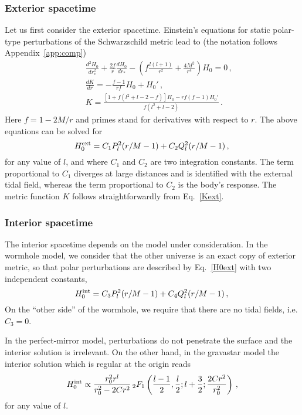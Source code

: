 \documentclass[aps,twocolumn,showpacs,preprintnumbers,nofootinbib,prd,superscriptaddress,groupedaddress,10pt]{revtex4-1}
\def\be{\begin{equation}}
\def\ee{\end{equation}}
\newcommand{\beq}{\begin{eqnarray}}
\newcommand{\eeq}{\end{eqnarray}}
\begin{document}
\subsubsection{Exterior spacetime}
Let us first consider the exterior spacetime. Einstein's equations for static polar-type perturbations of the Schwarzschild metric lead to (the notation follows Appendix~\ref{app:comp})
%
\beq
&&\frac{d^2H_0}{dr_*^2}+\frac{2f}{r}\frac{dH_0}{dr_*}-\left(f\frac{l(l+1)}{r^2}+\frac{4M^2}{r^4}\right)H_0=0\,,\\
%
&&\frac{dK}{dr}=-\frac{f-1}{r f}H_0+H_0'\,,\\
%
&&K=\frac{[1+f(l^2+l-2-f)]H_0-rf(f-1)H_0'}{f(l^2+l-2)}\,. \label{Kext}
\eeq
%
Here $f=1-2M/r$ and primes stand for derivatives with respect to $r$. The above equations can be solved for~\cite{Hinderer:2007mb,Binnington:2009bb}
\begin{equation}
 H_0^{\rm ext}=C_1P_l^2(r/M-1)+C_2Q_l^2(r/M-1)\,, \label{H0ext}\\
\end{equation}
for any value of $l$, and where $C_1$ and $C_2$ are two integration constants. The term proportional to $C_1$ diverges at large distances and is identified with the external tidal field, whereas the term proportional to $C_2$ is the body's response. The metric function $K$ follows straightforwardly from Eq.~\eqref{Kext}.

\subsubsection{Interior spacetime}
The interior spacetime depends on the model under consideration. In the wormhole model, we consider that the other universe is an exact copy of exterior metric, so that polar perturbations are described by Eq.~\eqref{H0ext} with two independent constants, 
\begin{equation}
 H_0^{\rm int}=C_3P_l^2(r/M-1)+C_4Q_l^2(r/M-1)\,, \label{H0intWH}\\
\end{equation}
On the ``other side'' of the wormhole, we require that there are no tidal fields, i.e. $C_3=0$.

In the perfect-mirror model, perturbations do not penetrate the surface and the interior solution is irrelevant. On the other hand, in the gravastar model the interior solution which is regular at the origin reads 
\be\label{H0intGS}
H_0^{\rm int} \propto \frac{r_0^2 r^l}{r_0^2 - 2C r^2}\,
{}_2F_1\left(\frac{l-1}{2},\frac{l}{2};l+\frac{3}{2};\frac{2 C r^2}{r_0^2}\right)\,,
\ee%
%
for any value of $l$. 
\end{document}
